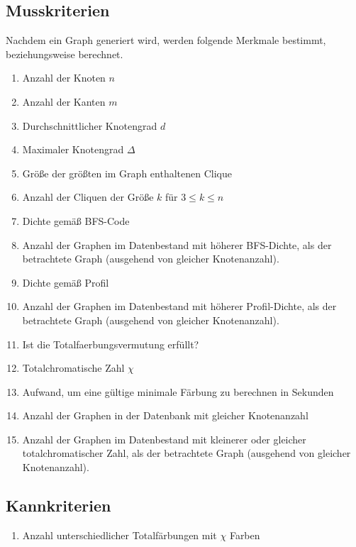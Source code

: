 \documentclass[13pt]{scrreprt}
\newcounter{tempcounter1}
\newcounter{tempcounter2}
\newcounter{tempcounter3}
\newcounter{tempcounter4}
\newcounter{tempcounter5}
\newcounter{tempcounter6}
\newcounter{tempcounter7}
\newcounter{tempcounter8}
\newcounter{tempcounter9}
\begin{document}
\subsection{Musskriterien}
Nachdem ein Graph generiert wird, werden folgende Merkmale bestimmt, beziehungsweise berechnet. \\
\begin{addmargin}[25pt]{0pt}
\begin{enumerate} [label=FA\arabic*,start=600]
	\label{FA6}
	\item Anzahl der Knoten $n$
    \item Anzahl der Kanten $m$
	\item Durchschnittlicher Knotengrad $d$
	\item Maximaler Knotengrad $\Delta$
	\item Größe der größten im Graph enthaltenen Clique
	\item Anzahl der Cliquen der Größe $k$ für $3 \leq k \leq n$
	\item Dichte gemäß BFS-Code
	\item Anzahl der Graphen im Datenbestand mit höherer BFS-Dichte, als der betrachtete Graph (ausgehend von gleicher Knotenanzahl).
    \item Dichte gemäß Profil 
	\item Anzahl der Graphen im Datenbestand mit höherer Profil-Dichte, als der betrachtete Graph (ausgehend von gleicher Knotenanzahl).
	\item Ist die \Gls{Totalfaerbungsvermutung} erfüllt?
    \item Totalchromatische Zahl $\chi$
    \item Aufwand, um eine gültige minimale Färbung zu berechnen in Sekunden
    \item Anzahl der Graphen in der Datenbank mit gleicher Knotenanzahl
   	\item Anzahl der Graphen im Datenbestand mit kleinerer oder gleicher totalchromatischer Zahl, als der betrachtete Graph (ausgehend von gleicher Knotenanzahl).
\setcounter{tempcounter8}{\value{enumi}}
\end{enumerate}
\end{addmargin}
\addtocounter{tempcounter8}{1}
\subsection{Kannkriterien}
\begin{addmargin}[25pt]{0pt}
\begin{enumerate} [label=FA\arabic*,start=\value{tempcounter8}]
   	 \item Anzahl unterschiedlicher Totalfärbungen mit $\chi$ Farben
    	
\end{enumerate}
\end{addmargin}
\end{document}
